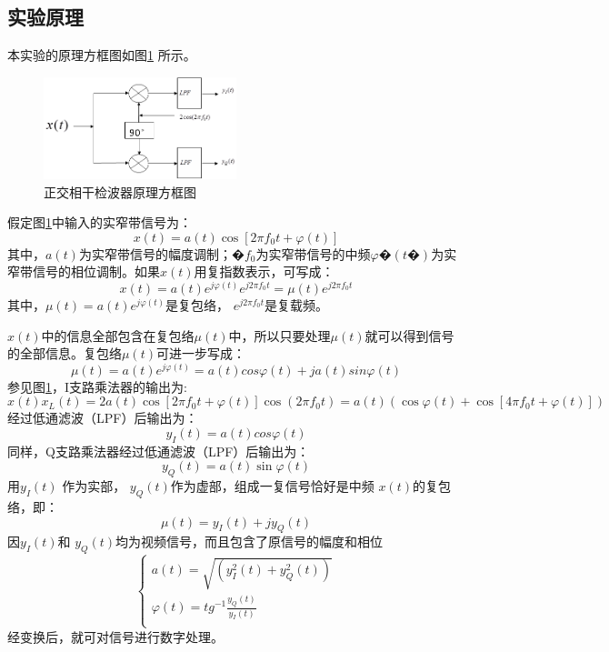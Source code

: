 \documentclass[12pt]{article}
\begin{document}
\subsection{实验原理}
本实验的原理方框图如图\ref{zjxgylKT1}
所示。\par
\begin{figure}[htbp]
  \centering
  \includegraphics[width=0.5\textwidth]{word/0012}
  \caption{正交相干检波器原理方框图}\label{zjxgylKT1}
\end{figure}
假定图\ref{zjxgylKT1}中输入的实窄带信号为：
\begin{equation}
x(t)=a(t)\cos[2\pi f_0 t+\varphi(t)]
\end{equation}
其中，$a(t)$为实窄带信号的幅度调制；�$f_0$为实窄带信号的中频$\varphi�(t�)$为实窄带信号的相位调制。如果$x(t)$用复指数表示，可写成：
\begin{equation}
  x(t)=a(t)e^{j\varphi(t)}e^{j 2\pi f_0 t}=\mu(t)e^{j 2\pi f_0 t}
\end{equation}
其中，$\mu(t)=a(t)e^{j\varphi (t)}$是复包络， $e^{j2\pi f_0 t}$是复载频。\par
$x(t)$中的信息全部包含在复包络$\mu (t)$中，所以只要处理$\mu (t)$就可以得到信号的全部信息。复包络$\mu (t)$可进一步写成：
\begin{equation}
 \mu (t)=a(t)e^{j\varphi (t)}=a(t)cos\varphi (t)+ja(t)sin\varphi (t)
\end{equation}
参见图\ref{zjxgylKT1}，I支路乘法器的输出为:
\begin{equation}
 x(t)x_L (t)=2a(t)\cos[2πf_0t+\varphi (t)]\cos(2\pi f_0t)=a(t)\left(\cos\varphi (t)+\cos[4\pi f_0 t+\varphi(t)] \right)
\end{equation}
经过低通滤波（LPF）后输出为：
\begin{equation}
y_I(t)=a(t)cos\varphi(t)
\end{equation}
同样，Q支路乘法器经过低通滤波（LPF）后输出为：
\begin{equation}
y_Q(t)=a(t)\sin\varphi (t)
\end{equation}
用$y_I(t)$ 作为实部， $y_Q(t)$作为虚部，组成一复信号恰好是中频 $x(t)$的复包络，即：
\begin{equation}
\mu (t)=y_I(t)+jy_Q(t)
\end{equation}
因$y_I(t)$和 $y_Q(t)$均为视频信号，而且包含了原信号的幅度和相位
\begin{equation}
\left\{
\begin{array}{c}
a(t)=\sqrt{(y^2_I(t)+y^2_Q(t))}\\
\varphi(t)=tg^{-1}\frac{y_Q (t)}{y_I (t)}\\
\end{array}\right.
\end{equation}
经变换后，就可对信号进行数字处理。
\end{document}
